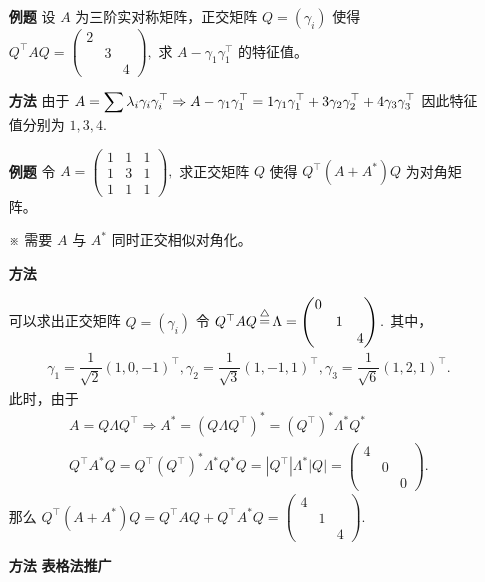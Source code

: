 \begin{enumerate}
    \item[\textbf{例题}] 设 $ A $ 为三阶实对称矩阵，正交矩阵 $ Q = (\gamma_i) $ 使得 $ Q^\top AQ = \begin{pmatrix}
        2&&\\&3&\\&&4
    \end{pmatrix}, $ 求 $ A - \gamma_1\gamma_1^\top $ 的特征值。 
    \item[\textbf{方法}] 
    由于 $ A = \displaystyle \sum\lambda_i\gamma_i\gamma_i^\top 
    \Rightarrow A - \gamma_1\gamma_1^\top = 
    1\gamma_1\gamma_1^\top + 
    3\gamma_2\gamma_2^\top + 
    4\gamma_3\gamma_3^\top $ 
    因此特征值分别为 $ 1,3,4. $ 
\end{enumerate}

\begin{enumerate}
    \item[\textbf{例题}] 令 $ A = \begin{pmatrix}
        1&1&1\\1&3&1\\1&1&1
    \end{pmatrix}, $ 求正交矩阵 $ Q $ 使得 $ Q^\top (A+A^*)Q $ 为对角矩阵。

    $ ※ $  需要 $ A $ 与 $ A^* $ 同时正交相似对角化。
    \item[\textbf{方法}]
    
    可以求出正交矩阵 $ Q = (\gamma_i) $ 令 $ Q^\top AQ \mathop=\limits^\triangle \Lambda = \begin{pmatrix}
        0&&\\&1&\\&&4
    \end{pmatrix}. $ 其中，
    \begin{equation*}
        \begin{aligned}
            \gamma_1 = \dfrac{1}{\sqrt 2}(1,0,-1)^\top,
            \gamma_2 = \dfrac{1}{\sqrt 3}(1,-1,1)^\top,
            \gamma_3 = \dfrac{1}{\sqrt 6}(1,2,1)^\top.
        \end{aligned}
    \end{equation*}
    此时，由于
    \begin{equation*}
        \begin{aligned}
            A = Q\Lambda Q^\top \Rightarrow A^* = (Q\Lambda Q^\top)^*
            = (Q^\top)^*\Lambda^*Q^* \\ 
            Q^\top A^*Q = Q^\top(Q^\top)^*\Lambda^*Q^*Q = |Q^\top|\Lambda^*|Q|
            = \begin{pmatrix}
                4&&\\&0&\\&&0
            \end{pmatrix}.
        \end{aligned}
    \end{equation*}
    那么 $ Q^\top(A+A^*)Q = Q^\top AQ + Q^\top A^*Q = \begin{pmatrix}
        4&&\\&1&\\&&4
    \end{pmatrix}. $ 
    \item[\textbf{方法}] \textbf{表格法推广}
    

\end{enumerate}

